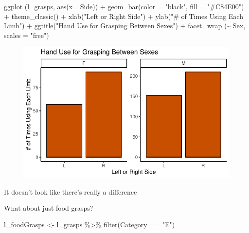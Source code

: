 \documentclass[
  letterpaper,
  DIV=11,
  numbers=noendperiod]{scrartcl}
\newenvironment{Shaded}{\begin{snugshade}}{\end{snugshade}}
\newcommand{\AttributeTok}[1]{\textcolor[rgb]{0.40,0.45,0.13}{#1}}
\newcommand{\FunctionTok}[1]{\textcolor[rgb]{0.28,0.35,0.67}{#1}}
\newcommand{\NormalTok}[1]{\textcolor[rgb]{0.00,0.23,0.31}{#1}}
\newcommand{\OtherTok}[1]{\textcolor[rgb]{0.00,0.23,0.31}{#1}}
\newcommand{\SpecialCharTok}[1]{\textcolor[rgb]{0.37,0.37,0.37}{#1}}
\newcommand{\StringTok}[1]{\textcolor[rgb]{0.13,0.47,0.30}{#1}}
\begin{document}
\begin{Shaded}
\begin{Highlighting}[]
\FunctionTok{ggplot}\NormalTok{ (l\_grasps, }\FunctionTok{aes}\NormalTok{(}\AttributeTok{x=}\NormalTok{ Side)) }\SpecialCharTok{+}
  \FunctionTok{geom\_bar}\NormalTok{(}\AttributeTok{color =} \StringTok{"black"}\NormalTok{, }\AttributeTok{fill =} \StringTok{"\#C84E00"}\NormalTok{) }\SpecialCharTok{+}
  \FunctionTok{theme\_classic}\NormalTok{() }\SpecialCharTok{+}
  \FunctionTok{xlab}\NormalTok{(}\StringTok{"Left or Right Side"}\NormalTok{) }\SpecialCharTok{+}
  \FunctionTok{ylab}\NormalTok{(}\StringTok{"\# of Times Using Each Limb"}\NormalTok{) }\SpecialCharTok{+}
  \FunctionTok{ggtitle}\NormalTok{(}\StringTok{"Hand Use for Grasping Between Sexes"}\NormalTok{) }\SpecialCharTok{+}
  \FunctionTok{facet\_wrap}\NormalTok{ (}\SpecialCharTok{\textasciitilde{}}\NormalTok{ Sex, }\AttributeTok{scales =} \StringTok{"free"}\NormalTok{)}
\end{Highlighting}
\end{Shaded}

\begin{figure}[H]

{\centering \includegraphics{LeftyLemurs_files/figure-pdf/unnamed-chunk-29-1.pdf}

}

\end{figure}

It doesn't look like there's really a difference

What about just food grasps?

\begin{Shaded}
\begin{Highlighting}[]
\NormalTok{l\_foodGrasps }\OtherTok{\textless{}{-}}
\NormalTok{l\_grasps }\SpecialCharTok{\%\textgreater{}\%} 
  \FunctionTok{filter}\NormalTok{(Category }\SpecialCharTok{==} \StringTok{"E"}\NormalTok{)}
\end{Highlighting}
\end{Shaded}
\end{document}
